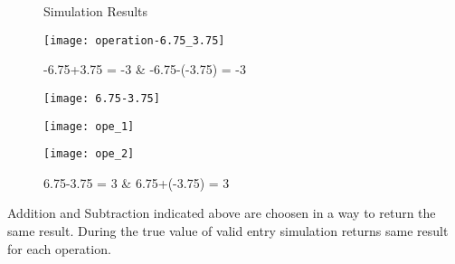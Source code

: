 \documentclass[11pt]{article}
\begin{document}
    \begin{figure}[h]
        \caption*{Simulation Results}
        \begin{minipage}{.45\textwidth}
            \begin{center}
                \texttt{[image: operation-6.75\_3.75]}
                \caption*{-6.75+3.75 = -3 \& -6.75-(-3.75) = -3}
            \end{center}
        \end{minipage}
        \begin{minipage}{.45\textwidth}
            \begin{center}
                \texttt{[image: 6.75-3.75]}
                \caption*{6.75-3.75 = 3 \& 6.75+(-3.75) = 3}
            \end{center}
        \end{minipage}

        \begin{minipage}{.45\textwidth}
            \begin{center}
                \texttt{[image: ope\_1]}
            \end{center}
        \end{minipage}
        \begin{minipage}{.45\textwidth}
            \begin{center}
                \texttt{[image: ope\_2]}
            \end{center}
        \end{minipage}
    \end{figure}
    \vspace{.2cm}
    \newline
    Addition and Subtraction indicated above are choosen in a way to return the same result. During the true value of valid entry simulation returns same result for each operation.
    \newpage
\end{document}
